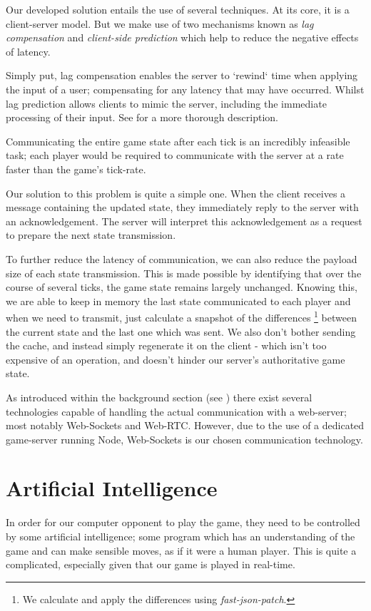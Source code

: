\documentclass{standalone}
\begin{document}
		\label{clientPrediction}
		Our developed solution entails the use of several techniques. At its core, it is a client-server model. But we make use of two mechanisms known as \emph{lag compensation}\parencite{LagCompensation} and \emph{client-side prediction}\parencite{LagPrediction} which help to reduce the negative effects of latency.\label{sec:lagCompensation}

		Simply put, lag compensation enables the server to `rewind` time when applying the input of a user; compensating for any latency that may have occurred. Whilst lag prediction allows clients to mimic the server, including the immediate processing of their input. See \parencite{LatencyCompensating} for a more thorough description.

		Communicating the entire game state after each tick is an incredibly infeasible task; each player would be required to communicate with the server at a rate faster than the game's tick-rate.

		Our solution to this problem is quite a simple one. When the client receives a message containing the updated state, they immediately reply to the server with an acknowledgement. The server will interpret this acknowledgement as a request to prepare the next state transmission.

		To further reduce the latency of communication, we can also reduce the payload size of each state transmission. This is made possible by identifying that over the course of several ticks, the game state remains largely unchanged. Knowing this, we are able to keep in memory the last state communicated to each player and when we need to transmit, just calculate a snapshot of the differences \footnote{We calculate and apply the differences using \emph{fast-json-patch}\parencite{FastJsonPatch}.} between the current state and the last one which was sent. We also don't bother sending the cache, and instead simply regenerate it on the client - which isn't too expensive of an operation, and doesn't hinder our server's authoritative game state.

		\label{designCommunicationTechnologies}
		As introduced within the background section (see ) there exist several technologies capable of handling the actual communication with a web-server; most notably Web-Sockets and Web-RTC. However, due to the use of a dedicated game-server running Node, Web-Sockets is our chosen communication technology.

	\section{Artificial Intelligence} \label{sec:design-ai}
		In order for our computer opponent to play the game, they need to be controlled by some artificial intelligence; some program which has an understanding of the game and can make sensible moves, as if it were a human player. This is quite a complicated, especially given that our game is played in real-time.
\end{document}
